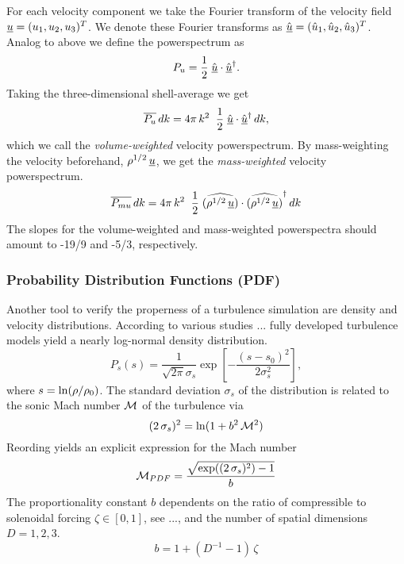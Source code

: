For each velocity component we take the Fourier transform of the velocity field
$\underline{u} = (u_1, u_2, u_3)^T$.
We denote these Fourier transforms as
$\hat{\underline{u}} = (\hat{u}_1, \hat{u}_2, \hat{u}_3)^T$. Analog
to above we define the powerspectrum as
\begin{equation}
    P_{u} = \frac{1}{2} \; \hat{\underline{u}} \cdot \hat{\underline{u}}^{\dagger}.
\end{equation}
Taking the three-dimensional shell-average we get
\begin{equation}
    \overline{P_{u}}\,dk = 4 \pi\,k^2 \;\; \frac{1}{2} \; \hat{\underline{u}} \cdot \hat{\underline{u}}^{\dagger}\,dk,
\end{equation}
which we call the \emph{volume-weighted} velocity powerspectrum. By
mass-weighting the velocity beforehand, $\rho^{1/2}\,\underline{u}$, we get the
\emph{mass-weighted} velocity powerspectrum.
\begin{equation}
    \overline{P_{mu}}\,dk = 4 \pi\,k^2 \;\; \frac{1}{2} \; \widehat{(\rho^{1/2}\,\underline{u})} \cdot \widehat{(\rho^{1/2}\,\underline{u})}^{\dagger}\,dk
\end{equation}
The slopes for the volume-weighted and mass-weighted powerspectra
should amount to -19/9 and -5/3, respectively.

\subsubsection{Probability Distribution Functions (PDF)}
\label{sec:theory-density-pdf}
Another tool to verify the properness of a turbulence simulation are density
and velocity distributions. According to various studies ... fully developed
turbulence models yield a nearly log-normal density distribution.
\begin{equation}
\label{eqn:density-pdf}
P_s(s) = \frac{1}{\sqrt{2\pi}\sigma_s} \exp\left[-\frac{(s-s_0)^2}{2\sigma_s^2}\right],
\end{equation}
where $s = \ln(\rho/\rho_0)$. The standard deviation $\sigma_s$ of
the distribution is related to the sonic Mach number $\mathcal{M}$ of the
turbulence via
\begin{equation}
(2\,\sigma_s)^2 = \ln(1 + b^2\,\mathcal{M}^2)
\end{equation}
Reording yields an explicit expression for the Mach number
\begin{equation}
\label{eqn:density-pdf-mach}
\mathcal{M}_{PDF} = \frac{\sqrt{\exp((2\,\sigma_s)^2) - 1}}{b}
\end{equation}
The proportionality constant $b$ dependents on the ratio of compressible to
solenoidal forcing $\zeta \in [0,1]$, see ..., and the number of spatial
dimensions $D = 1,2,3$.
\begin{equation}
\label{eqn:density-pdf-mach-constant}
b = 1 + (D^{-1} - 1) \, \zeta
\end{equation}
